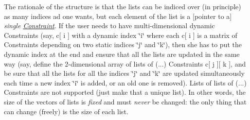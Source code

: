 The rationale of the structure is that the lists can be indiced over (in principle) as many indices ad one wants, but each element of the list is a \mbox{[}pointer to a\mbox{]} {\itshape single \mbox{\hyperlink{class_s_m_spp__di__unipi__it_1_1_constraint}{Constraint}}}. If the user needs to have multi-\/dimensional dynamic Constraints (say, c\mbox{[} i \mbox{]} with a dynamic index \char`\"{}i\char`\"{} where each c\mbox{[} i \mbox{]} is a matrix of Constraints depending on two static indices \char`\"{}j\char`\"{} and \char`\"{}k\char`\"{}), then she has to put the dynamic index at the end and ensure that all the lists are updated in the same way (say, define the 2-\/dimensional array of lists of (...) Constraints c\mbox{[} j \mbox{]}\mbox{[} k \mbox{]}, and be sure that all the lists for all the indices \char`\"{}j\char`\"{} and \char`\"{}k\char`\"{} are updated simultaneously each time a new index \char`\"{}i\char`\"{} is added, or an old one is removed). Lists of lists of (...) Constraints are not supported (just make that a unique list). In other words, the size of the vectors of lists is {\itshape fixed} and must {\itshape never} be changed\+: the only thing that can change (freely) is the size of each list.

